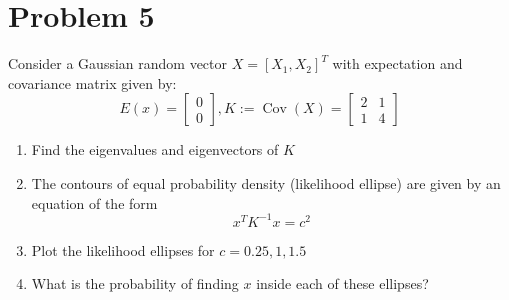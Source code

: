 \documentclass[10pt,a4paper,oneside]{article}
\begin{document}
\section* {Problem 5} 
Consider a Gaussian random vector $X=\left[X_{1}, X_{2}\right]^{T}$ with expectation and covariance matrix given by:
\[
E(x)=\left[\begin{array}{l}{0} \\ {0}\end{array}\right], K :=\operatorname{Cov}(X)=\left[\begin{array}{ll}{2} & {1} \\ {1} & {4}\end{array}\right]
\]
\begin{enumerate}
\item Find the eigenvalues and eigenvectors of $K$
\item The contours of equal probability density (likelihood ellipse) are given by an equation of the
	form
	\[
	x^{T} K^{-1} x=c^{2}
	\]
\item Plot the likelihood ellipses for $c=0.25,1,1.5$
\item What is the probability of finding $x$ inside each of these ellipses?
\end{enumerate}
\end{document}
